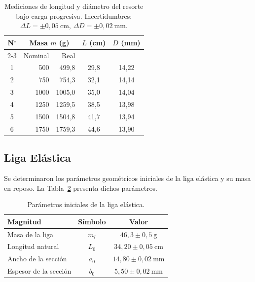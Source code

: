 \begin{table}[H]
    \centering
    \caption{Mediciones de longitud y diámetro del resorte bajo carga progresiva.
             Incertidumbres: $\Delta L = \pm 0{,}05\ \text{cm}$,\;
             $\Delta D = \pm 0{,}02\ \text{mm}$.}
    \label{tab:datos_resorte}
    \begin{tabular}{crrcc}
        \toprule
        \multirow{2}{*}{\textbf{N$^{\circ}$}}
            & \multicolumn{2}{c}{\textbf{Masa $m$ (g)}}
            & \textbf{$L$ (cm)}
            & \textbf{$D$ (mm)} \\
        \cmidrule(lr){2-3}
            & Nominal & Real & & \\
        \midrule
        1 &  500 &  499{,}8 & 29{,}8 & 14{,}22 \\
        2 &  750 &  754{,}3 & 32{,}1 & 14{,}14 \\
        3 & 1000 & 1005{,}0 & 35{,}0 & 14{,}04 \\
        4 & 1250 & 1259{,}5 & 38{,}5 & 13{,}98 \\
        5 & 1500 & 1504{,}8 & 41{,}7 & 13{,}94 \\
        6 & 1750 & 1759{,}3 & 44{,}6 & 13{,}90 \\
        \bottomrule
    \end{tabular}
\end{table}

\subsection{Liga Elástica}

Se determinaron los parámetros geométricos iniciales de la liga elástica
y su masa en reposo. La Tabla~\ref{tab:param_liga} presenta dichos
parámetros.

\begin{table}[H]
    \centering
    \caption{Parámetros iniciales de la liga elástica.}
    \label{tab:param_liga}
    \begin{tabular}{lcc}
        \toprule
        \textbf{Magnitud} & \textbf{Símbolo} & \textbf{Valor} \\
        \midrule
        Masa de la liga       & $m_l$ & $46{,}3  \pm 0{,}5\  \text{g}$   \\
        Longitud natural      & $L_0$ & $34{,}20 \pm 0{,}05\ \text{cm}$  \\
        Ancho de la sección   & $a_0$ & $14{,}80 \pm 0{,}02\ \text{mm}$  \\
        Espesor de la sección & $b_0$ & $5{,}50  \pm 0{,}02\ \text{mm}$  \\
        \bottomrule
    \end{tabular}
\end{table}

